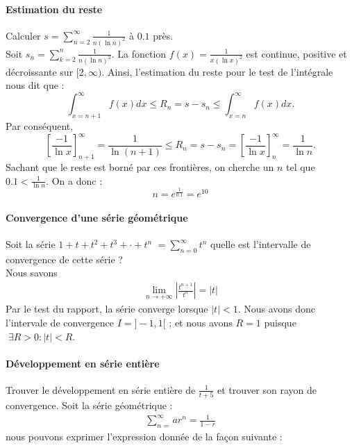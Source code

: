 \documentclass{report}
\begin{document}
\begin{multicols*}{2}
      \paragraph{Estimation du reste}
      Calculer $s = \sum_{n=2}^{\infty } \frac{1}{n (\ln n)^2}$ à 
      $0.1$ près. 
      \vspace{1em}\\
      Soit $s_n=\sum_{k=2}^n \frac{1}{n(\ln n)^2}$. 
      La fonction $f(x)=\frac{1}{x(\ln x)^2}$ est continue, positive et décroissante 
      sur $[2, \infty)$. Ainsi, l'estimation du reste pour le test de l'intégrale 
      nous dit que :
      $$
      \int_{x=n+1}^{\infty } f(x) d x \leq R_n=s-s_n \leq \int_{x=n}^{\infty} f(x) d x .
      $$
      Par conséquent,
      $$
      \left[\frac{-1}{\ln x}\right]_{n+1}^{\infty}=\frac{1}{\ln (n+1)} 
      \leq R_n=s-s_n=\left[\frac{-1}{\ln x}\right]_n^{\infty}=\frac{1}{\ln n} .
      $$
      Sachant que le reste est borné par ces frontières, on cherche un 
      $n$ tel que $0.1 < \frac{1}{\ln n}$. On a donc : 
      \[ n = e^{\frac{1}{0.1}} =   e^{10} \]

      \paragraph{Convergence d'une série géométrique}
      Soit la série $1 + t + t^2 + t^3 + \cdot + t^n$ 
          $ = \sum_{n=0}^{\infty } t^n $ 
      quelle est l'intervalle de convergence de cette série ?
      \mbox{}\\ 
      Nous savons 
      \begin{align*}
        \lim\limits_{n \to+\infty } \left|\frac{t^{n+1}}{t^n}\right|   = |t|
      \end{align*}  
      Par le test du rapport, la série converge lorsque $|t| < 1$.  
      Nous avons donc l'intervale de convergence $I = ]-1, 1[$ ; 
      et nous avons $R = 1$  puisque  $\; \exists R > 0 : |t| < R$. 

      \paragraph{Développement en série entière}
      Trouver le développement en série entière de  
      $\frac{1}{t+5}$ et trouver son rayon de convergence.  
      Soit la série géométrique :
      \begin{align*}
        \sum_{n=}^{\infty }ar^n = \frac{1}{1 - r} 
      \end{align*}
      nous pouvons exprimer l'expression donnée de la façon suivante : 



\end{multicols*}
\end{document}
